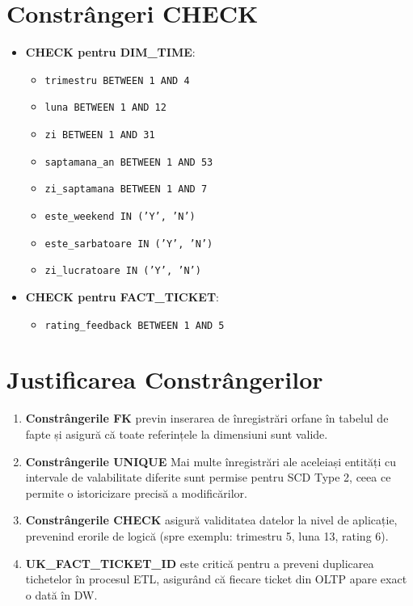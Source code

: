 \section{Constrângeri CHECK}

\begin{itemize}
    \item \textbf{CHECK pentru DIM\_TIME}:
    \begin{itemize}
        \item \texttt{trimestru BETWEEN 1 AND 4}
        \item \texttt{luna BETWEEN 1 AND 12}
        \item \texttt{zi BETWEEN 1 AND 31}
        \item \texttt{saptamana\_an BETWEEN 1 AND 53}
        \item \texttt{zi\_saptamana BETWEEN 1 AND 7}
        \item \texttt{este\_weekend IN ('Y', 'N')}
        \item \texttt{este\_sarbatoare IN ('Y', 'N')}
        \item \texttt{zi\_lucratoare IN ('Y', 'N')}
    \end{itemize}
    \item \textbf{CHECK pentru FACT\_TICKET}:
    \begin{itemize}
        \item \texttt{rating\_feedback BETWEEN 1 AND 5}
    \end{itemize}
\end{itemize}

\section{Justificarea Constrângerilor}

\begin{enumerate}
    \item \textbf{Constrângerile FK} previn inserarea de înregistrări orfane în tabelul de fapte și asigură că toate referințele la dimensiuni sunt valide.
    
    \item \textbf{Constrângerile UNIQUE} Mai multe înregistrări ale aceleiași entități cu intervale de valabilitate diferite sunt permise pentru SCD Type 2, ceea ce permite o istoricizare precisă a modificărilor.
    
    \item \textbf{Constrângerile CHECK} asigură validitatea datelor la nivel de aplicație, prevenind erorile de logică (spre exemplu: trimestru 5, luna 13, rating 6).
    
    \item \textbf{UK\_FACT\_TICKET\_ID} este critică pentru a preveni duplicarea tichetelor în procesul ETL, asigurând că fiecare ticket din OLTP apare exact o dată în DW.
\end{enumerate}

